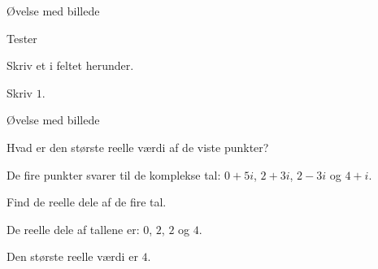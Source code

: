 \documentclass{article}
\begin{document}

\tableofcontents
\newpage

\begin{exercise}{Øvelse med billede}



Tester

Skriv et i feltet herunder.



\hint
Skriv $1$.
\end{exercise}



\begin{exercise}{Øvelse med billede}


Hvad er den største reelle værdi af de viste punkter?


\hint
De fire punkter svarer til de komplekse tal:
$0 + 5i$, $2 + 3i$, $2 - 3i$ og $4 + i$.

\hint
Find de reelle dele af de fire tal.

\hint
De reelle dele af tallene er:
$0$, $2$, $2$ og $4$.

\hint
Den største reelle værdi er $4$.
\end{exercise}
\end{document}
